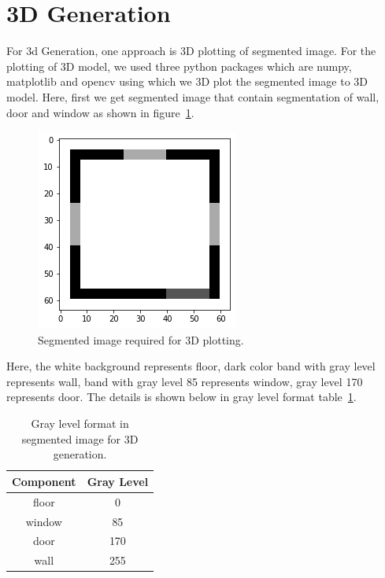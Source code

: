         \section{3D Generation}
            For 3d Generation, one approach is 3D plotting of segmented image.
            For the plotting of 3D model, we used three python packages which are numpy, matplotlib and opencv using which we 3D plot the segmented image to 3D model. Here, first we get segmented image that contain segmentation of wall, door and window as shown in figure~\ref{fig:base-for-3d}.\\
            \begin{figure}[h]                 
                \centering                 
                \includegraphics[width=.5\textwidth]{img/experiment/3d_generation/base-for-3d-generation.png}                 
                \caption{Segmented image required for 3D plotting.}                 
                \label{fig:base-for-3d}         
            \end{figure}
            \break
            Here, the white background represents floor, dark color band with gray level represents wall, band with gray level 85 represents window, gray level 170 represents door.
            The details is shown below in gray level format table~\ref{tab:graylevel}.\\
            \begin{table}[]
                \centering
                \caption{Gray level format in segmented image for 3D generation.}
                \label{tab:graylevel}
                \begin{tabular}{|c|c|}
                    \hline
                    \textbf{Component} & \textbf{Gray Level}\\
                    \hline
                    floor & 0\\
                    \hline
                    window & 85\\
                    \hline
                    door & 170\\
                    \hline
                    wall & 255\\
                    \hline
                \end{tabular}
            \end{table}
